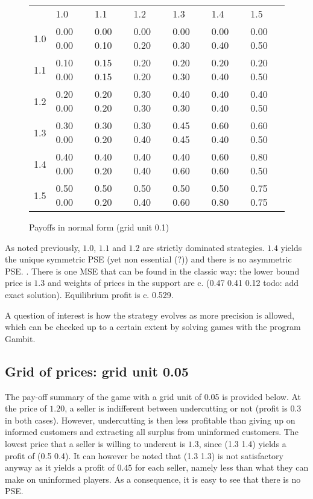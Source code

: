 \documentclass[11pt]{article}
\begin{document}
\begin{figure}[h]
\caption{Payoffs in normal form (grid unit 0.1)}
\begin{singlespace}
\begin{tabular}{lllllll}
   {}   & 1.0       & 1.1       & 1.2       & 1.3       & 1.4       & 1.5       \\
   1.0  & 0.00 0.00 & 0.00 0.10 & 0.00 0.20 & 0.00 0.30 & 0.00 0.40 & 0.00 0.50 \\
   1.1  & 0.10 0.00 & 0.15 0.15 & 0.20 0.20 & 0.20 0.30 & 0.20 0.40 & 0.20 0.50 \\
   1.2  & 0.20 0.00 & 0.20 0.20 & 0.30 0.30 & 0.40 0.30 & 0.40 0.40 & 0.40 0.50 \\
   1.3  & 0.30 0.00 & 0.30 0.20 & 0.30 0.40 & 0.45 0.45 & 0.60 0.40 & 0.60 0.50 \\
   1.4  & 0.40 0.00 & 0.40 0.20 & 0.40 0.40 & 0.40 0.60 & 0.60 0.60 & 0.80 0.50 \\
   1.5  & 0.50 0.00 & 0.50 0.20 & 0.50 0.40 & 0.50 0.60 & 0.50 0.80 & 0.75 0.75 \\
\end{tabular}
\end{singlespace}
\end{figure}

As noted previously, $1.0$, $1.1$ and $1.2$ are strictly dominated strategies. $1.4$ yields the unique symmetric PSE (yet non essential (?)) and there is no asymmetric PSE. . There is one MSE that can be found in the classic way: the lower bound price is $1.3$ and weights of prices in the support are c. (0.47 0.41 0.12 todo: add exact solution). Equilibrium profit is c. 0.529.

A question of interest is how the strategy evolves as more precision is allowed, which can be checked up to a certain extent by solving games with the program Gambit.

\subsection{Grid of prices: grid unit 0.05}

The pay-off summary of the game with a grid unit of 0.05 is provided below. At the price of $1.20$, a seller is indifferent between undercutting or not (profit is $0.3$ in both cases). However, undercutting is then less profitable than giving up on informed customers and extracting all surplus from uninformed customers. The lowest price that a seller is willing to undercut is $1.3$, since (1.3 1.4) yields a profit of (0.5 0.4). It can however be noted that (1.3 1.3) is not satisfactory anyway as it yields a profit of $0.45$ for each seller, namely less than what they can make on uninformed players. As a consequence, it is easy to see that there is no PSE.
\end{document}
